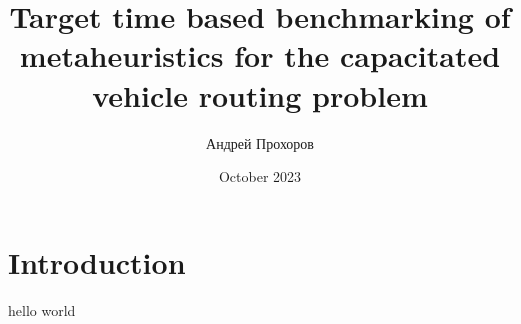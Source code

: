 \documentclass{article}
\title{Target time based benchmarking of metaheuristics for the capacitated vehicle routing problem}
\author{Андрей Прохоров}
\date{October 2023}
\begin{document}
\maketitle

\section{Introduction}

hello world
\end{document}
